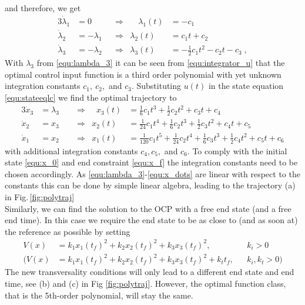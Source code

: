 and therefore, we get
\begin{alignat}{3}
\nonumber
	\dot \lambda_1 &= 0 \quad  & &\Rightarrow &\quad \lambda_1(t) &= -c_1 \\
\nonumber
	\dot \lambda_2 &= -\lambda_1 & &\Rightarrow  & \lambda_2(t) &= c_1 t + c_2 \\
\label{equ:lambda_3}
	\dot \lambda_3 &= -\lambda_2 & &\Rightarrow  & \lambda_3(t) &= -\frac{1}{2}c_1 t^2 - c_2 t - c_3 \; , 
\end{alignat}
With $\lambda_3$ from \eqref{equ:lambda_3} it can be seen from \eqref{equ:integrator_u} that the optimal control input function is a third order polynomial with yet unknown integration constants $c_1, \ c_2,$ and $c_3$. Substituting $u(t)$ in the state equation \eqref{equ:stateeqlc} we find the optimal trajectory to 
\begin{alignat}{3}
	\dot x_3 &= \lambda_3 \;\;  & &\Rightarrow &\;\; x_3(t) &= \frac{1}{6}c_1 t^3  + \frac{1}{2}c_2 t^2 + c_3 t + c_4 \\
	\dot x_2 &= x_3 & &\Rightarrow  & x_2(t) &=\frac{1}{24} c_1 t^4 + \frac{1}{6}c_2 t^3 + \frac{1}{2} c_3 t^2 + c_4 t + c_5 \\
	\dot x_1 &= x_2 & &\Rightarrow  & x_1(t) &=\frac{1}{120} c_1 t^5 + \frac{1}{24} c_2 t^4 + \frac{1}{6}c_3 t^3 +\frac{1}{2}c_4 t^2 + c_5 t + c_6
	\label{equ:x_dots}
\end{alignat}
with additional integration constants $c_4,c_5,$ and $c_6$. To comply with the initial state \eqref{equ:x_0} and end constraint \eqref{equ:x_f} the integration constants need to be chosen accordingly. As \eqref{equ:lambda_3}-\eqref{equ:x_dots} are linear with respect to the constants this can be done by simple linear algebra, leading to the trajectory (a) in Fig.\,\ref{fig:polytraj} 
\\
Similarly, we can find the solution to the OCP with a free end state (and a free end time). In this case we require the end state to be as close to (and as soon at) the reference as possible by setting
\begin{align*}
V(x) &=k_1 x_1 (t_f)^2+k_2 x_2(t_f)^2 + k_3 x_3(t_f)^2 ,&& k_i>0\\
(V(x) &=k_1 x_1 (t_f)^2+k_2 x_2(t_f)^2 + k_3 x_3(t_f)^2 + k_t t_f,&& k_i,k_t>0 )
\end{align*}
The new transversality conditions will only lead to a different end state and end time, see (b) and (c) in Fig \ref{fig:polytraj}. However, the optimal function class, that is the 5th-order polynomial, will stay the same.

